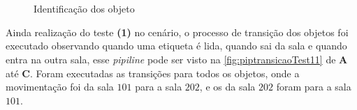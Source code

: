 \begin{figure}[ht]
        \centering\caption{Identificação dos objeto}
        \label{fig:piptransicao}
         \hspace{0.5cm}
\\
        \hspace{0.5cm}
\\
              \hspace{0.5cm}
\end{figure}

\newpage
Ainda realização do teste \textbf{(1)} no cenário, o processo de transição dos objetos foi executado observando quando uma etiqueta é lida, quando sai da sala e quando entra na outra sala, esse \textit{pipiline} pode ser visto na \autoref{fig:piptransicaoTest11} de \textbf{A} até \textbf{C}. Foram executadas as transições para todos os objetos, onde a movimentação foi da sala $101$ para a sala $202$, e os da sala $202$ foram para a sala $101$.


